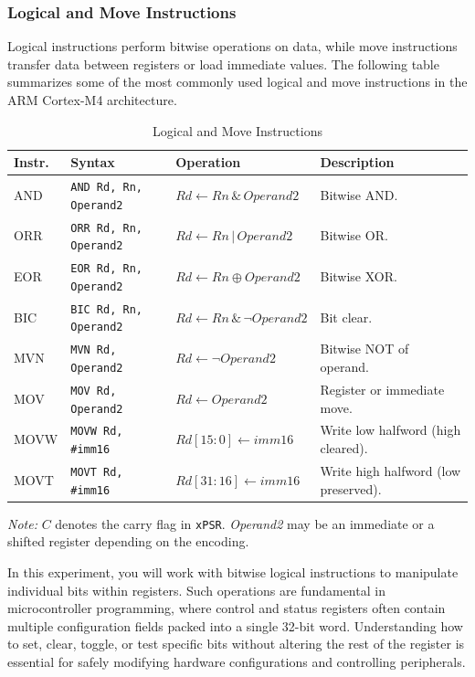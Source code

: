 \subsubsection{Logical and Move Instructions}
Logical instructions perform bitwise operations on data, while move instructions transfer data between registers or load immediate values. The following table summarizes some of the most commonly used logical and move instructions in the ARM Cortex-M4 architecture.
\begin{table}[H]
\centering
\caption{Logical and Move Instructions}
\small
\begin{tabularx}{\linewidth}{@{}l l l X@{}}
\toprule
\textbf{Instr.} & \textbf{Syntax} & \textbf{Operation} & \textbf{Description} \\
\midrule
AND  & \texttt{AND Rd, Rn, Operand2} & $Rd \leftarrow Rn \,\&\, Operand2$ & Bitwise AND. \\
ORR  & \texttt{ORR Rd, Rn, Operand2} & $Rd \leftarrow Rn \,|\, Operand2$ & Bitwise OR. \\
EOR  & \texttt{EOR Rd, Rn, Operand2} & $Rd \leftarrow Rn \oplus Operand2$ & Bitwise XOR. \\
BIC  & \texttt{BIC Rd, Rn, Operand2} & $Rd \leftarrow Rn \,\&\, \neg Operand2$ & Bit clear. \\
MVN  & \texttt{MVN Rd, Operand2}     & $Rd \leftarrow \neg Operand2$ & Bitwise NOT of operand. \\
MOV  & \texttt{MOV Rd, Operand2}     & $Rd \leftarrow Operand2$ & Register or immediate move. \\
MOVW & \texttt{MOVW Rd, \#imm16}     & $Rd[15{:}0] \leftarrow imm16$ & Write low halfword (high cleared). \\
MOVT & \texttt{MOVT Rd, \#imm16}     & $Rd[31{:}16] \leftarrow imm16$ & Write high halfword (low preserved). \\
\bottomrule
\end{tabularx}

\vspace{2pt}
\footnotesize\emph{Note:} $C$ denotes the carry flag in \texttt{xPSR}. \emph{Operand2} may be an immediate or a shifted register depending on the encoding.
\end{table}

In this experiment, you will work with bitwise logical instructions to manipulate individual bits within registers.
Such operations are fundamental in microcontroller programming, where control and status registers often contain multiple configuration fields packed into a single 32-bit word.
Understanding how to set, clear, toggle, or test specific bits without altering the rest of the register is essential for safely modifying hardware configurations and controlling peripherals.
